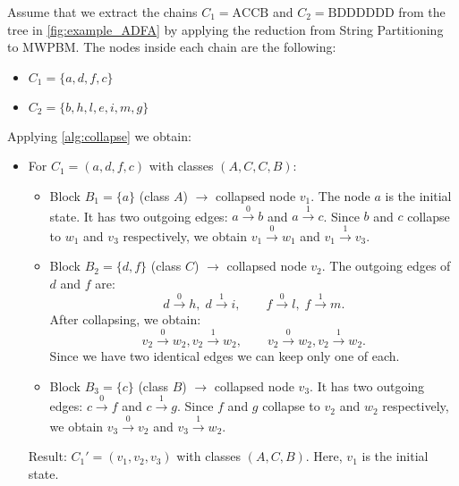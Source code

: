 \begin{example}
    Assume that we extract the chains $C_1 = \text{ACCB}$ and $C_2 = \text{BDDDDDD}$ from the tree in \cref{fig:example_ADFA} by applying the reduction from String Partitioning to MWPBM. The nodes inside each chain are the following:
    \begin{itemize}
        \item $C_1 = \{a,d,f,c\}$
        \item $C_2 = \{b,h,l,e,i,m,g\}$
    \end{itemize}
    
    Applying \cref{alg:collapse} we obtain:
    \begin{itemize}
        \item For $C_1 = (a,d,f,c)$ with classes $(A,C,C,B)$: 
        \begin{itemize}
            \item Block $B_1 = \{a\}$ (class $A$) $\rightarrow$ collapsed node $v_1$. The node $a$ is the initial state. It has two outgoing edges: $a \xrightarrow{0} b$ and $a \xrightarrow{1} c$. Since $b$ and $c$ collapse to $w_1$ and $v_3$ respectively, we obtain $v_1 \xrightarrow{0} w_1$ and $v_1 \xrightarrow{1} v_3$.
            \item Block $B_2 = \{d,f\}$ (class $C$) $\rightarrow$ collapsed node $v_2$. The outgoing edges of $d$ and $f$ are:
            \[
                d \xrightarrow{0} h,\; d \xrightarrow{1} i,\qquad
                f \xrightarrow{0} l,\; f \xrightarrow{1} m.
            \]
            After collapsing, we obtain:
            \[
                v_2 \xrightarrow{0} w_2, v_2 \xrightarrow{1} w_2,\qquad v_2 \xrightarrow{0} w_2, v_2 \xrightarrow{1} w_2.
            \]
            Since we have two identical edges we can keep only one of each.
            \item Block $B_3 = \{c\}$ (class $B$) $\rightarrow$ collapsed node $v_3$. It has two outgoing edges: $c \xrightarrow{0} f$ and $c \xrightarrow{1} g$. Since $f$ and $g$ collapse to $v_2$ and $w_2$ respectively, we obtain $v_3 \xrightarrow{0} v_2$ and $v_3 \xrightarrow{1} w_2$.
        \end{itemize}
        Result: $C_1' = (v_1, v_2, v_3)$ with classes $(A, C, B)$. Here, $v_1$ is the initial state.
        

\end{itemize}
\end{example}
